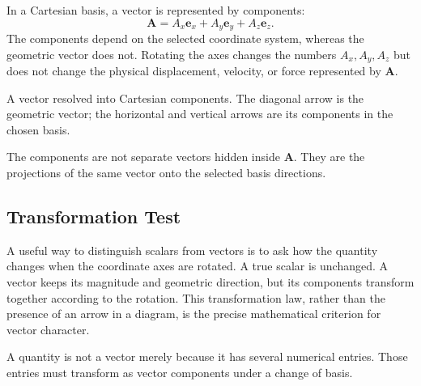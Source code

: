 In a Cartesian basis, a vector is represented by components:
\[
\mathbf A=A_x\mathbf e_x+A_y\mathbf e_y+A_z\mathbf e_z.
\]
The components depend on the selected coordinate system, whereas the geometric
vector does not. Rotating the axes changes the numbers $A_x,A_y,A_z$ but does
not change the physical displacement, velocity, or force represented by
$\mathbf A$.

\begin{bookfigure}{A vector resolved into Cartesian components. The diagonal
arrow is the geometric vector; the horizontal and vertical arrows are its
components in the chosen basis.}

\end{bookfigure}

\begin{visualguidebox}
The components are not separate vectors hidden inside $\mathbf A$. They are the
projections of the same vector onto the selected basis directions.
\end{visualguidebox}

\subsection{Transformation Test}

A useful way to distinguish scalars from vectors is to ask how the quantity
changes when the coordinate axes are rotated. A true scalar is unchanged. A
vector keeps its magnitude and geometric direction, but its components
transform together according to the rotation. This transformation law, rather
than the presence of an arrow in a diagram, is the precise mathematical
criterion for vector character.

\begin{warningbox}
A quantity is not a vector merely because it has several numerical entries.
Those entries must transform as vector components under a change of basis.
\end{warningbox}
